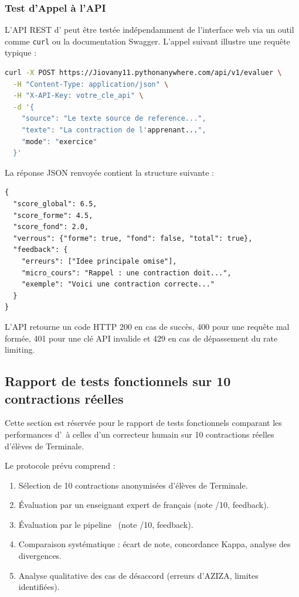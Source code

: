 \subsubsection{Test d'Appel à l'API}
\label{subsec:test-api}

L'API REST d'\AZIZA{} peut être testée indépendamment de l'interface web via un outil comme \texttt{curl} ou la documentation Swagger. L'appel suivant illustre une requête typique :

\begin{lstlisting}[caption=Test de l'API avec curl,language=bash]
curl -X POST https://Jiovany11.pythonanywhere.com/api/v1/evaluer \
  -H "Content-Type: application/json" \
  -H "X-API-Key: votre_cle_api" \
  -d '{
    "source": "Le texte source de reference...",
    "texte": "La contraction de l'apprenant...",
    "mode": "exercice"
  }'
\end{lstlisting}

La réponse JSON renvoyée contient la structure suivante :

\begin{lstlisting}[caption=Structure de la réponse JSON de l'API,language={}]
{
  "score_global": 6.5,
  "score_forme": 4.5,
  "score_fond": 2.0,
  "verrous": {"forme": true, "fond": false, "total": true},
  "feedback": {
    "erreurs": ["Idee principale omise"],
    "micro_cours": "Rappel : une contraction doit...",
    "exemple": "Voici une contraction correcte..."
  }
}
\end{lstlisting}

L'API retourne un code HTTP 200 en cas de succès, 400 pour une requête mal formée, 401 pour une clé API invalide et 429 en cas de dépassement du rate limiting.

\subsection{Rapport de tests fonctionnels sur 10 contractions réelles}

\label{sec:tests_fonctionnels}

Cette section est réservée pour le rapport de tests fonctionnels comparant les performances d'\AZIZA\ à celles d'un correcteur humain sur 10 contractions réelles d'élèves de Terminale.

Le protocole prévu comprend :

\begin{enumerate}
    \item Sélection de 10 contractions anonymisées d'élèves de Terminale.
    \item Évaluation par un enseignant expert de français (note /10, feedback).
    \item Évaluation par le pipeline \AZIZA\ (note /10, feedback).
    \item Comparaison systématique : écart de note, concordance Kappa, analyse des divergences.
    \item Analyse qualitative des cas de désaccord (erreurs d'AZIZA, limites identifiées).
\end{enumerate}

